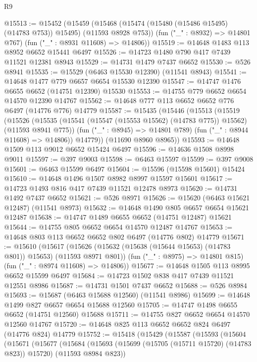 \begin{lexlean}{R9}
\begin{coremodule}
{{{{{{{{{{{{{{{{{{{{{{{{{{{{{{{{{{{{{{{{{{{{{{{{{{{{{{{{{{{{{{{{{{{{{{{{{{{{{{{{{{{{@15513 := @15452
    (@15459
      (@15468 (@15474 (@15480 (@15486 @15495) (@14783 @753)) @15495) (@11593 @8928 @753))
      (fun ("_" : @8932) => @14801 @767)
      (fun ("_" : @8931 @11608) => @14806))
@15519 := @14648 @1483 @113 @8952 @6652 @15441 @6497
@15526 := @14723 @1480 @790 @417 @7439 @11521 @12381 @8943
@15529 := @14731 @1479 @7437 @6652
@15530 := @526 @8941
@15535 := @15529 (@6463 @15530 @12390) (@11541 @8943)
@15541 := @14648 @1477 @779 @6657 @6654 @15530 @12390
@15547 := @14747 @1476 @6655 @6652 (@14751 @12390) @15530
@15553 := @14755 @779 @6652 @6654 @14570 @12390 @14767
@15562 := @14648 @777 @113 @6652 @6652 @776 @6497 (@14776 @776) @14779
@15587 := @15435
    (@15446
      (@15513
        (@15519
          (@15526
            (@15535 (@15541 (@15547 (@15553 @15562) (@14783 @775)) @15562) (@11593 @8941 @775))
            (fun ("_" : @8945) => @14801 @789)
            (fun ("_" : @8944 @11608) => @14806))
          @14779))
      (@11690 @8960 @8965))
@15593 := @14648 @1509 @113 @9012 @6652 @15424 @6497
@15596 := @14636 @1508 @8998 @9011
@15597 := @397 @9003
@15598 := @6463 @15597
@15599 := @397 @9008
@15601 := @6463 @15599 @6497
@15604 := @15596 (@15598 @15601) @15424
@15610 := @14648 @1496 @1507 @8982 @8997 @15597 @15601
@15617 := @14723 @1493 @816 @417 @7439 @11521 @12478 @8973
@15620 := @14731 @1492 @7437 @6652
@15621 := @526 @8971
@15626 := @15620 (@6463 @15621 @12487) (@11541 @8973)
@15632 := @14648 @1490 @805 @6657 @6654 @15621 @12487
@15638 := @14747 @1489 @6655 @6652 (@14751 @12487) @15621
@15644 := @14755 @805 @6652 @6654 @14570 @12487 @14767
@15653 := @14648 @803 @113 @6652 @6652 @802 @6497 (@14776 @802) @14779
@15671 := @15610
    (@15617
      (@15626 (@15632 (@15638 (@15644 @15653) (@14783 @801)) @15653) (@11593 @8971 @801))
      (fun ("_" : @8975) => @14801 @815)
      (fun ("_" : @8974 @11608) => @14806))
@15677 := @14648 @1505 @113 @8995 @6652 @15599 @6497
@15684 := @14723 @1502 @838 @417 @7439 @11521 @12551 @8986
@15687 := @14731 @1501 @7437 @6652
@15688 := @526 @8984
@15693 := @15687 (@6463 @15688 @12560) (@11541 @8986)
@15699 := @14648 @1499 @827 @6657 @6654 @15688 @12560
@15705 := @14747 @1498 @6655 @6652 (@14751 @12560) @15688
@15711 := @14755 @827 @6652 @6654 @14570 @12560 @14767
@15720 := @14648 @825 @113 @6652 @6652 @824 @6497 (@14776 @824) @14779
@15752 := @15418
    (@15429
      (@15587
        (@15593
          (@15604
            (@15671
              (@15677
                (@15684
                  (@15693
                    (@15699 (@15705 (@15711 @15720) (@14783 @823)) @15720)
                    (@11593 @8984 @823))
}}}}}}}}}}}}}}}}}}}}}}}}}}}}}}}}}}}}}}}}}}}}}}}}}}}}}}}}}}}}}}}}}}}}}}}}}}}}}}}}}}}}
\end{coremodule}
\end{lexlean}
